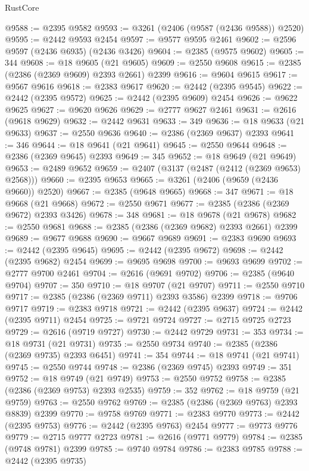 \begin{lexlean}{RustCore}
\begin{coremodule}
@9588 := @2395 @9582
@9593 := @3261 (@2406 (@9587 (@2436 @9588)) @2520)
@9595 := @2442 @9593 @2454
@9597 := @9577 @9595 @2461
@9602 := @2596 @9597 (@2436 @6935) (@2436 @3426)
@9604 := @2385 (@9575 @9602)
@9605 := 344
@9608 := @18 @9605 (@21 @9605)
@9609 := @2550 @9608
@9615 := @2385 (@2386 (@2369 @9609) @2393 @2661) @2399
@9616 := @9604 @9615
@9617 := @9567 @9616
@9618 := @2383 @9617
@9620 := @2442 (@2395 @9545)
@9622 := @2442 (@2395 @9572)
@9625 := @2442 (@2395 @9609) @2454
@9626 := @9622 @9625
@9627 := @9620 @9626
@9629 := @2777 @9627 @2461
@9631 := @2616 (@9618 @9629)
@9632 := @2442 @9631
@9633 := 349
@9636 := @18 @9633 (@21 @9633)
@9637 := @2550 @9636
@9640 := @2386 (@2369 @9637) @2393
@9641 := 346
@9644 := @18 @9641 (@21 @9641)
@9645 := @2550 @9644
@9648 := @2386 (@2369 @9645) @2393
@9649 := 345
@9652 := @18 @9649 (@21 @9649)
@9653 := @2489 @9652
@9659 := @2407 (@3137 (@2487 (@2412 (@2369 @9653) @2568)))
@9660 := @2395 @9653
@9665 := @3261 (@2406 (@9659 (@2436 @9660)) @2520)
@9667 := @2385 (@9648 @9665)
@9668 := 347
@9671 := @18 @9668 (@21 @9668)
@9672 := @2550 @9671
@9677 := @2385 (@2386 (@2369 @9672) @2393 @3426)
@9678 := 348
@9681 := @18 @9678 (@21 @9678)
@9682 := @2550 @9681
@9688 := @2385 (@2386 (@2369 @9682) @2393 @2661) @2399
@9689 := @9677 @9688
@9690 := @9667 @9689
@9691 := @2383 @9690
@9693 := @2442 (@2395 @9645)
@9695 := @2442 (@2395 @9672)
@9698 := @2442 (@2395 @9682) @2454
@9699 := @9695 @9698
@9700 := @9693 @9699
@9702 := @2777 @9700 @2461
@9704 := @2616 (@9691 @9702)
@9706 := @2385 (@9640 @9704)
@9707 := 350
@9710 := @18 @9707 (@21 @9707)
@9711 := @2550 @9710
@9717 := @2385 (@2386 (@2369 @9711) @2393 @3586) @2399
@9718 := @9706 @9717
@9719 := @2383 @9718
@9721 := @2442 (@2395 @9637)
@9724 := @2442 (@2395 @9711) @2454
@9725 := @9721 @9724
@9727 := @2715 @9725 @2723
@9729 := @2616 (@9719 @9727)
@9730 := @2442 @9729
@9731 := 353
@9734 := @18 @9731 (@21 @9731)
@9735 := @2550 @9734
@9740 := @2385 (@2386 (@2369 @9735) @2393 @6451)
@9741 := 354
@9744 := @18 @9741 (@21 @9741)
@9745 := @2550 @9744
@9748 := @2386 (@2369 @9745) @2393
@9749 := 351
@9752 := @18 @9749 (@21 @9749)
@9753 := @2550 @9752
@9758 := @2385 (@2386 (@2369 @9753) @2393 @2535)
@9759 := 352
@9762 := @18 @9759 (@21 @9759)
@9763 := @2550 @9762
@9769 := @2385 (@2386 (@2369 @9763) @2393 @8839) @2399
@9770 := @9758 @9769
@9771 := @2383 @9770
@9773 := @2442 (@2395 @9753)
@9776 := @2442 (@2395 @9763) @2454
@9777 := @9773 @9776
@9779 := @2715 @9777 @2723
@9781 := @2616 (@9771 @9779)
@9784 := @2385 (@9748 @9781) @2399
@9785 := @9740 @9784
@9786 := @2383 @9785
@9788 := @2442 (@2395 @9735)

\end{coremodule}
\end{lexlean}
